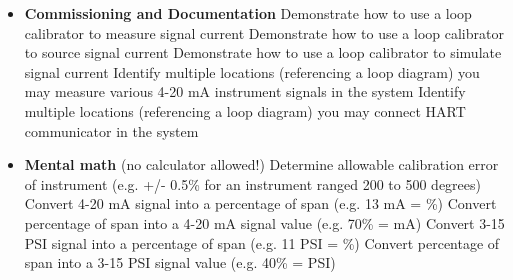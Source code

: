 \filbreak

\begin{itemize}
\item{} {\bf Commissioning and Documentation}
\itemitem{} Demonstrate how to use a loop calibrator to measure signal current
\itemitem{} Demonstrate how to use a loop calibrator to source signal current
\itemitem{} Demonstrate how to use a loop calibrator to simulate signal current
\itemitem{} Identify multiple locations (referencing a loop diagram) you may measure various 4-20 mA instrument signals in the system
\itemitem{} Identify multiple locations (referencing a loop diagram) you may connect HART communicator in the system
\end{itemize}

\filbreak

\begin{itemize}
\item{} {\bf Mental math} (no calculator allowed!)
\itemitem{} Determine allowable calibration error of instrument (e.g. +/- 0.5\% for an instrument ranged 200 to 500 degrees)
\itemitem{} Convert 4-20 mA signal into a percentage of span (e.g. 13 mA = \underbar{\hskip 20pt}\%)
\itemitem{} Convert percentage of span into a 4-20 mA signal value (e.g. 70\% = \underbar{\hskip 20pt} mA)
\itemitem{} Convert 3-15 PSI signal into a percentage of span (e.g. 11 PSI = \underbar{\hskip 20pt}\%)
\itemitem{} Convert percentage of span into a 3-15 PSI signal value (e.g. 40\% = \underbar{\hskip 20pt} PSI)
\end{itemize}

\filbreak

